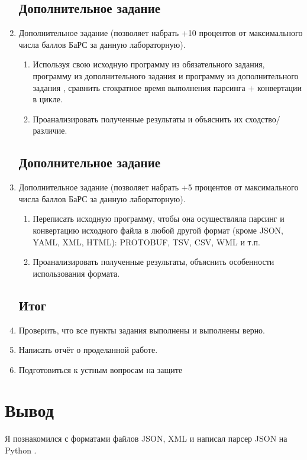 \documentclass{article}
\begin{document}
\begin{enumerate}
            \subsection{Дополнительное задание }
      \item Дополнительное задание  (позволяет набрать +10
            процентов от максимального числа баллов БаРС за данную
            лабораторную).
            \begin{enumerate}
                  \item Используя свою исходную программу из обязательного
                        задания, программу из дополнительного задания  и
                        программу из дополнительного задания , сравнить
                        стократное время выполнения парсинга + конвертации в
                        цикле.
                  \item Проанализировать полученные результаты и объяснить их
                        сходство/различие.
            \end{enumerate}

            \lstset{language=Python}
            \lstset{language=Python}

            \subsection{Дополнительное задание }
      \item  Дополнительное задание  (позволяет набрать +5
            процентов от максимального числа баллов БаРС за данную
            лабораторную).
            \begin{enumerate}
                  \item  Переписать исходную программу, чтобы она осуществляла
                        парсинг и конвертацию исходного файла в любой другой
                        формат (кроме JSON, YAML, XML, HTML): PROTOBUF,
                        TSV, CSV, WML и т.п.
                  \item  Проанализировать полученные результаты, объяснить
                        особенности использования формата.
            \end{enumerate}

            \lstset{language=Python}
            \lstset{language=Python}

            \subsection{Итог}
      \item  Проверить, что все пункты задания выполнены и выполнены верно.
      \item  Написать отчёт о проделанной работе.
      \item  Подготовиться к устным вопросам на защите
\end{enumerate}

\section{Вывод}
Я познакомился с форматами файлов JSON, XML и написал парсер JSON на Python .
\end{document}
